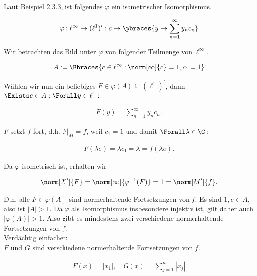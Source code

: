\begin{solution}
\begin{enumerate}
\end{enumerate}

Laut Beispiel 2.3.3, ist folgendes $\varphi$ ein isometrischer Isomorphismus.

\begin{align*}
  \varphi:
  \ell^\infty \to (\ell^1)^\prime:
  c \mapsto
  \pbraces
  {
    y \mapsto
    \sum_{n = 1}^\infty y_n c_n
  }
\end{align*}

Wir betrachten das Bild unter $\varphi$ von folgender Teilmenge von $\ell^\infty$.

\begin{align*}
  A :=
  \Bbraces
  {
    c \in \ell^\infty:
    \norm[\infty]{c} = 1,  c_1 = 1
  }
\end{align*}

Wählen wir nun ein beliebiges $F \in \varphi(A) \subseteq (\ell^1)^\prime$, dann $\Exists c \in A: \Forall y \in \ell^1:$

\begin{align*}
  F(y)
  =
  \sum_{n=1}^\infty y_n c_n.
\end{align*}

$F$ setzt $f$ fort, d.h. $F|_M = f$, weil $c_1 = 1$ und damit $\Forall \lambda \in \C:$

\begin{align*}
  F(\lambda e)
  =
  \lambda c_1
  =
  \lambda
  =
  f(\lambda e).
\end{align*}

Da $\varphi$ isometrisch ist, erhalten wir

\begin{align*}
  \norm[X^\prime]{F}
  =
  \norm[\infty]{\varphi^{-1}(F)}
  =
  1
  =
  \norm[M^\prime]{f}.
\end{align*}

D.h. alle $F \in \varphi(A)$ sind normerhaltende Fortsetzungen von $f$.
Es sind $1, e \in A$, also ist $|A| > 1$.
Da $\varphi$ als Isomorphismus insbesondere injektiv ist, gilt daher auch $|\varphi(A)| > 1$.
Also gibt es mindestens zwei verschiedene normerhaltende Fortsetzungen von $f$. \\

Verdächtig einfacher: \\
$F$ und $G$ sind verschiedene normerhaltende Fortsetzungen von $f$.

\begin{align*}
  F(x) = |x_1|,
  \quad
  G(x) = \sum_{j=1}^n |x_j|
\end{align*}

\end{solution}
